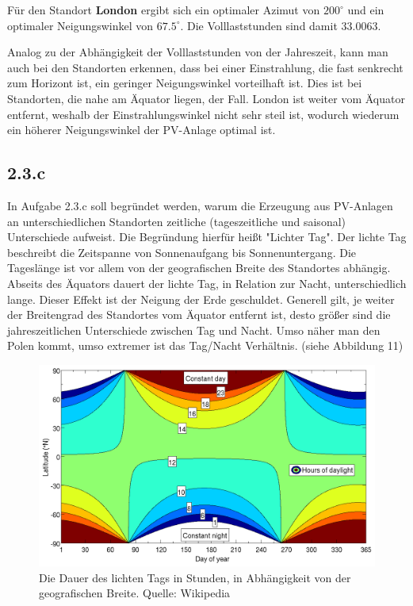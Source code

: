 \documentclass[a4paper,12pt]{article}
\begin{document}
	Für den Standort \textbf{London} ergibt sich ein optimaler Azimut von $200^{\circ}$ und ein optimaler Neigungswinkel von $67.5^{\circ}$. Die Volllaststunden sind damit $33.0063$.\\ \par
	Analog zu der Abhängigkeit der Volllaststunden von der Jahreszeit, kann man auch bei den Standorten erkennen, dass bei einer Einstrahlung, die fast senkrecht zum Horizont ist, ein geringer Neigungswinkel vorteilhaft ist. Dies ist bei Standorten, die nahe am Äquator liegen, der Fall.\newline
	London ist weiter vom Äquator entfernt, weshalb der Einstrahlungswinkel nicht sehr steil ist, wodurch wiederum ein höherer Neigungswinkel der PV-Anlage optimal ist.
	\subsection{2.3.c}
	In Aufgabe 2.3.c soll begründet werden, warum die Erzeugung aus PV-Anlagen an unterschiedlichen Standorten zeitliche (tageszeitliche und saisonal) Unterschiede aufweist.\newline
	Die Begründung hierfür heißt "Lichter Tag". Der lichte Tag beschreibt die Zeitspanne von Sonnenaufgang bis Sonnenuntergang.\newline
	Die Tageslänge ist vor allem von der geografischen Breite des Standortes abhängig. Abseits des Äquators dauert der lichte Tag, in Relation zur Nacht, unterschiedlich lange. Dieser Effekt ist der Neigung der Erde geschuldet.\newline
	Generell gilt, je weiter der Breitengrad des Standortes vom Äquator entfernt ist, desto größer sind die jahreszeitlichen Unterschiede zwischen Tag und Nacht.\newline
	Umso näher man den Polen kommt, umso extremer ist das Tag/Nacht Verhältnis. (siehe Abbildung 11)\newline
	\begin{figure}[H]
		\centering
		\includegraphics[width=12cm]{img/results/LichtTagDauer}
		\caption{Die Dauer des lichten Tags in Stunden, in Abhängigkeit von der geografischen Breite. Quelle: Wikipedia}
	\end{figure}
\end{document}

